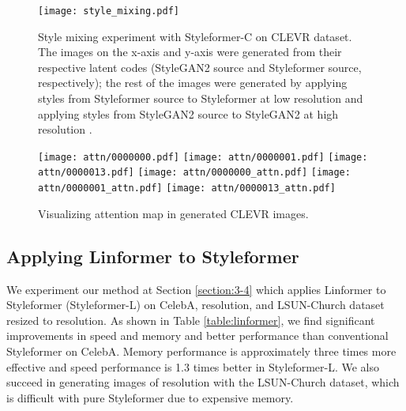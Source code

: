 \documentclass[10pt,twocolumn,letterpaper]{article}
\begin{document}
\begin{figure*}[t]
\begin{center}
\texttt{[image: style\_mixing.pdf]}

\end{center}
\vspace{-5mm}
\caption{Style mixing experiment with Styleformer-C on CLEVR dataset. The images on the x-axis and y-axis were generated from their respective latent codes (StyleGAN2 source and Styleformer source, respectively); the rest of the images were generated by applying styles from Styleformer source to Styleformer at low resolution  and applying styles from StyleGAN2 source to StyleGAN2 at high resolution \cite{karras2019stylebased}. 
}
\vspace{-3mm}
\label{fig:style-mixing}
\end{figure*}


\begin{figure}[t]
\begin{center}
\texttt{[image: attn/0000000.pdf]}
\texttt{[image: attn/0000001.pdf]}
\texttt{[image: attn/0000013.pdf]}
\texttt{[image: attn/0000000\_attn.pdf]}
\texttt{[image: attn/0000001\_attn.pdf]}
\texttt{[image: attn/0000013\_attn.pdf]}
\end{center}
\vspace{-5mm}
\caption{Visualizing attention map in generated CLEVR images.
}
\vspace{-3mm}
\label{fig:vis_attn}
\end{figure}





\subsection{Applying Linformer to Styleformer}
\label{section:4-2}
We experiment our method at Section \ref{section:3-4} which applies Linformer to Styleformer (Styleformer-L) on CelebA,  resolution, and LSUN-Church \cite{yu2016lsun} dataset resized to  resolution. 
As shown in Table \ref{table:linformer}, we find significant improvements in speed and memory and better performance than conventional Styleformer on CelebA. Memory performance is approximately three times more effective and speed performance is 1.3 times better in Styleformer-L. We also succeed in generating images of  resolution with the LSUN-Church dataset, which is difficult with pure Styleformer due to expensive memory. 
\end{document}
